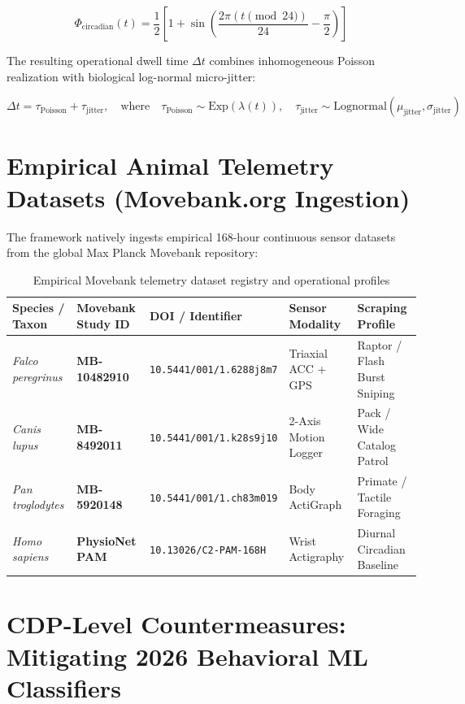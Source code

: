 \documentclass[11pt,a4paper]{article}
\begin{document}
\begin{equation}
\Phi_{\text{circadian}}(t) = \frac{1}{2} \left[1 + \sin\left(\frac{2\pi (t \pmod{24})}{24} - \frac{\pi}{2}\right)\right]
\end{equation}

\noindent The resulting operational dwell time $\Delta t$ combines inhomogeneous Poisson realization with biological log-normal micro-jitter:

\begin{equation}
\Delta t = \tau_{\text{Poisson}} + \tau_{\text{jitter}}, \quad \text{where} \quad \tau_{\text{Poisson}} \sim \text{Exp}(\lambda(t)), \quad \tau_{\text{jitter}} \sim \text{Lognormal}(\mu_{\text{jitter}}, \sigma_{\text{jitter}})
\end{equation}

\section{Empirical Animal Telemetry Datasets (Movebank.org Ingestion)}

The framework natively ingests empirical 168-hour continuous sensor datasets from the global Max Planck Movebank repository:

\begin{table}[h!]
\centering
\small
\begin{tabular}{lllll}
\toprule
\textbf{Species / Taxon} & \textbf{Movebank Study ID} & \textbf{DOI / Identifier} & \textbf{Sensor Modality} & \textbf{Scraping Profile} \\ \midrule
\textit{Falco peregrinus} & \textbf{MB-10482910} & \texttt{10.5441/001/1.6288j8m7} & Triaxial ACC + GPS & Raptor / Flash Burst Sniping \\
\textit{Canis lupus} & \textbf{MB-8492011} & \texttt{10.5441/001/1.k28s9j10} & 2-Axis Motion Logger & Pack / Wide Catalog Patrol \\
\textit{Pan troglodytes} & \textbf{MB-5920148} & \texttt{10.5441/001/1.ch83m019} & Body ActiGraph & Primate / Tactile Foraging \\
\textit{Homo sapiens} & \textbf{PhysioNet PAM} & \texttt{10.13026/C2-PAM-168H} & Wrist Actigraphy & Diurnal Circadian Baseline \\ \bottomrule
\end{tabular}
\caption{Empirical Movebank telemetry dataset registry and operational profiles}
\end{table}

\section{CDP-Level Countermeasures: Mitigating 2026 Behavioral ML Classifiers}
\end{document}
